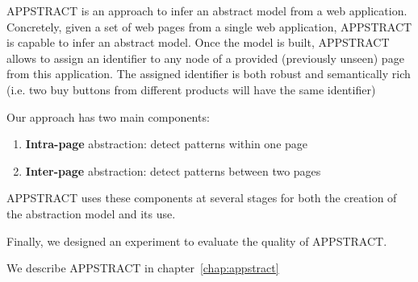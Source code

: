 APPSTRACT is an approach to infer an abstract model from a web application.
Concretely, given a set of web pages from a single web application, APPSTRACT is capable to infer an abstract model. Once the model is built, APPSTRACT allows to assign an identifier to any node of a provided (previously unseen) page from this application. The assigned identifier is both robust and semantically rich (i.e. two buy buttons from different products will have the same identifier) 

Our approach has two main components:
\begin{enumerate}
    \item \textbf{Intra-page} abstraction: detect patterns within one page
    \item \textbf{Inter-page} abstraction: detect patterns between two pages 
\end{enumerate}
APPSTRACT uses these components at several stages for both the creation of the abstraction model and its use. 

Finally, we designed an experiment to evaluate the quality of APPSTRACT. 

We describe APPSTRACT in chapter~\ref{chap:appstract}

